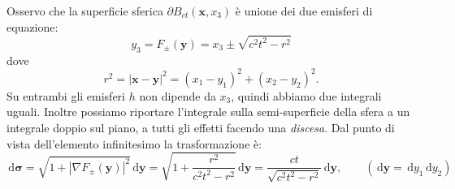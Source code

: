 \documentclass[10pt,a4paper,twoside,openright]{book}
\newcommand{\x}{\mathbf{x}}
\newcommand{\y}{\mathbf{y}}
\newcommand{\sigg}{\bm{\sigma}}
\newcommand{\de}{\,\mathrm d}
\newcommand{\dy}{\de y}
\newcommand{\dyy}{\de \y}
\newcommand{\dsig}{\de \sigg}
\begin{document}
Osservo che la superficie sferica $\displaystyle \partial B_{ct}(\x ,x_{3})$ è unione dei due emisferi di equazione:
\begin{equation*}
    y_{3} =F_{\pm }(\y) =x_{3} \pm \sqrt{c^{2} t^{2} -r^{2}}
\end{equation*}
dove
\begin{equation*}
    r^{2} =| \x -\y| ^{2} =(x_{1} -y_{1})^{2} +(x_{2} -y_{2})^{2} .
\end{equation*}
Su entrambi gli emisferi $h$ non dipende da $\displaystyle x_{3}$, quindi abbiamo due integrali uguali. Inoltre possiamo riportare l'integrale sulla semi-superficie della sfera a un integrale doppio sul piano, a tutti gli effetti facendo una \textit{discesa}. Dal punto di vista dell'elemento infinitesimo la trasformazione è:
\begin{equation*}
    \dsig =\sqrt{1+| \nabla F_{\pm }(\y)| ^{2}} \dyy =\sqrt{1+\frac{r^{2}}{c^{2} t^{2} -r^{2}}} \dyy =\frac{ct}{\sqrt{c^{2} t^{2} -r^{2}}} \dyy,\qquad  (\dyy =\dy_{1} \dy_{2})
\end{equation*}
\end{document}
